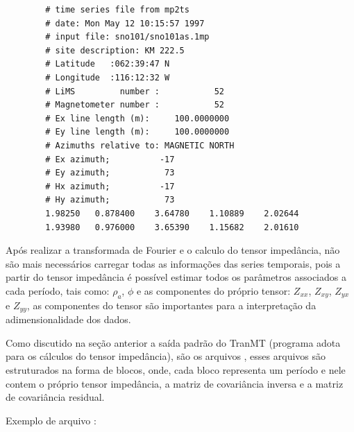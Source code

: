         \begin{footnotesize}        
\begin{verbatim}
        # time series file from mp2ts 
        # date: Mon May 12 10:15:57 1997
        # input file: sno101/sno101as.1mp
        # site description: KM 222.5
        # Latitude   :062:39:47 N
        # Longitude  :116:12:32 W
        # LiMS         number :           52
        # Magnetometer number :           52
        # Ex line length (m):     100.0000000
        # Ey line length (m):     100.0000000
        # Azimuths relative to: MAGNETIC NORTH 
        # Ex azimuth;          -17
        # Ey azimuth;           73 
        # Hx azimuth;          -17 
        # Hy azimuth;           73 
        1.98250   0.878400    3.64780    1.10889    2.02644                                  
        1.93980   0.976000    3.65390    1.15682    2.01610                                     
\end{verbatim}
\end{footnotesize}
            \begin{flushright}
                \cite{ts-format}
            \end{flushright}
        
        Após realizar a transformada de Fourier e o calculo do tensor impedância, não são mais necessários carregar todas as informações das series temporais, pois a partir do tensor impedância é possível estimar todos os parâmetros associados a cada período, tais como: $\rho_a$, $\phi$ e as componentes do próprio tensor: $Z_{xx}$, $Z_{xy}$, $Z_{yx}$ e $Z_{yy}$, as componentes do tensor são importantes para a interpretação da adimensionalidade dos dados.
        
        Como discutido na seção anterior a saída padrão do TranMT (programa adota para os cálculos do tensor impedância), são os arquivos , esses arquivos são estruturados na forma de blocos, onde, cada bloco representa um período e nele contem o próprio tensor impedância, a matriz de covariância inversa e a matriz de covariância residual.
        
        Exemplo de arquivo :
        
